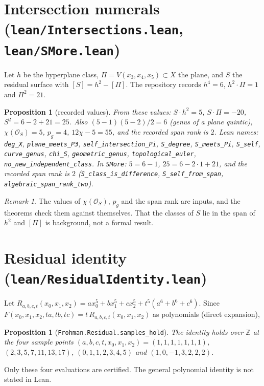 \documentclass[11pt]{amsart}
\newtheorem{proposition}[theorem]{Proposition}
\theoremstyle{definition}
\theoremstyle{remark}
\newtheorem{remark}[theorem]{Remark}
\begin{document}
\section{Intersection numerals (\texttt{lean/Intersections.lean}, \texttt{lean/SMore.lean})}
Let $h$ be the hyperplane class, $\Pi=V(x_3,x_4,x_5)\subset X$ the plane, and $S$ the residual surface with $[S]=h^2-[\Pi]$. The repository records $h^4=6$, $h^2\cdot\Pi=1$ and $\Pi^2=21$.
\begin{proposition}[recorded values]
From these values: $S\cdot h^2=5$, $S\cdot\Pi=-20$, $S^2=6-2+21=25$. Also $(5-1)(5-2)/2=6$ (genus of a plane quintic), $\chi(\mathcal O_S)=5$, $p_g=4$, $12\chi-5=55$, and the recorded span rank is $2$. Lean names: \texttt{deg\_X}, \texttt{plane\_meets\_P3}, \texttt{self\_intersection\_Pi}, \texttt{S\_degree}, \texttt{S\_meets\_Pi}, \texttt{S\_self}, \texttt{curve\_genus}, \texttt{chi\_S}, \texttt{geometric\_genus}, \texttt{topological\_euler}, \texttt{no\_new\_independent\_class}. In \texttt{SMore}: $5=6-1$, $25=6-2\cdot1+21$, and the recorded span rank is $2$ (\texttt{S\_class\_is\_difference}, \texttt{S\_self\_from\_span}, \texttt{algebraic\_span\_rank\_two}).
\end{proposition}
\begin{remark}
The values of $\chi(\mathcal O_S)$, $p_g$ and the span rank are inputs, and the theorems check them against themselves. That the classes of $S$ lie in the span of $h^2$ and $[\Pi]$ is background, not a formal result.
\end{remark}

\section{Residual identity (\texttt{lean/ResidualIdentity.lean})}
Let $R_{a,b,c,t}(x_0,x_1,x_2)=ax_0^5+bx_1^5+cx_2^5+t^5(a^6+b^6+c^6)$. Since $F(x_0,x_1,x_2,ta,tb,tc)=t\,R_{a,b,c,t}(x_0,x_1,x_2)$ as polynomials (direct expansion),
\begin{proposition}[\texttt{Frohman.Residual.samples\_hold}]
The identity holds over $\mathbb Z$ at the four sample points $(a,b,c,t,x_0,x_1,x_2)=(1,1,1,1,1,1,1)$, $(2,3,5,7,11,13,17)$, $(0,1,1,2,3,4,5)$ and $(1,0,-1,3,2,2,2)$.
\end{proposition}
Only these four evaluations are certified. The general polynomial identity is not stated in Lean.
\end{document}
